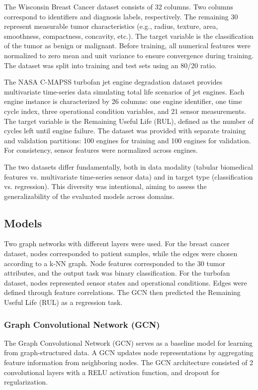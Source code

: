 \documentclass[12pt]{article}
\begin{document}
The Wisconsin Breast Cancer dataset consists of 32 columns. Two columns correspond to identifiers and diagnosis labels, respectively.
The remaining 30 represent measurable tumor characteristics (e.g., radius, texture, area, smoothness, compactness, concavity, etc.). The target variable is the classification of the tumor as benign or malignant. Before training, all numerical features were normalized to zero mean and unit variance to ensure convergence during training. The dataset was split into training and test sets using an 80/20 ratio.


The NASA C-MAPSS turbofan jet engine degradation dataset provides multivariate time-series data simulating total life scenarios of jet engines. Each engine instance is characterized by 26 columns: one engine identifier, one time cycle index, three operational condition variables, and 21 sensor measurements. The target variable is the Remaining Useful Life (RUL), defined as the number of cycles left until engine failure.
The dataset was provided with separate training and validation partitions: 100 engines for training and 100 engines for validation. For consistency, sensor features were normalized across engines.


The two datasets differ fundamentally, both in data modality (tabular biomedical features vs. multivariate time-series sensor data) and in target type (classification vs. regression). This diversity was intentional, aiming to assess the generalizability of the evaluated models across domains.


\subsection{Models}
Two graph networks with different layers were used.
For the breast cancer dataset, nodes corresponded to patient samples, while the edges were chosen according to a k-NN graph. Node features corresponded to the 30 tumor attributes, and the output task was binary classification.
For the turbofan dataset, nodes represented sensor states and operational conditions. Edges were defined through feature correlations. The GCN then predicted the Remaining Useful Life (RUL)
as a regression task.

\subsubsection{Graph Convolutional Network (GCN)}
The Graph Convolutional Network (GCN) serves as a baseline model for learning from graph-structured data. A GCN updates node representations by aggregating feature information from neighboring nodes.
The GCN architecture consisted of 2 convolutional layers with a  RELU activation function, and dropout for regularization.
\end{document}
